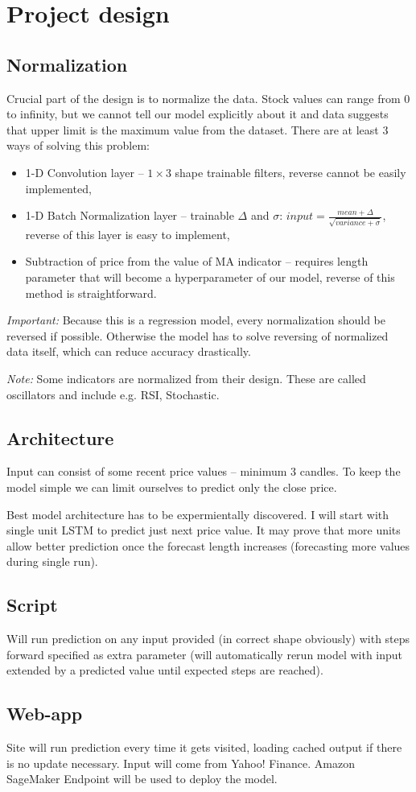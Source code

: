 \documentclass[a4paper,12pt]{article}
\begin{document}
\section{Project design}
\subsection{Normalization}
Crucial part of the design is to normalize the data.
Stock values can range from 0 to infinity, but we cannot tell our model explicitly about it and data suggests that upper limit is the maximum value from the dataset.
There are at least 3 ways of solving this problem:
\begin{itemize}
	\item 1-D Convolution layer -- $1\times3$ shape trainable filters, reverse cannot be easily implemented,
	\item 1-D Batch Normalization layer -- trainable $\Delta$ and $\sigma$: $input = \frac{mean + \Delta}{\sqrt{variance + \sigma}}$, reverse of this layer is easy to implement,
	\item Subtraction of price from the value of MA indicator -- requires length parameter that will become a hyperparameter of our model, reverse of this method is straightforward.
\end{itemize}

\textit{Important:} Because this is a regression model, every normalization should be reversed if possible. Otherwise the model has to solve reversing of normalized data itself, which can reduce accuracy drastically.

\textit{Note:} Some indicators are normalized from their design. These are called oscillators and include e.g. RSI, Stochastic.

\subsection{Architecture}
Input can consist of some recent price values -- minimum 3 candles. To keep the model simple we can limit ourselves to predict only the close price.

Best model architecture has to be expermientally discovered. I will start with single unit LSTM to predict just next price value. It may prove that more units allow better prediction once the forecast length increases (forecasting more values during single run).

\subsection{Script}
Will run prediction on any input provided (in correct shape obviously) with steps forward specified as extra parameter (will automatically rerun model with input extended by a predicted value until expected steps are reached).

\subsection{Web-app}
Site will run prediction every time it gets visited, loading cached output if there is no update necessary. Input will come from Yahoo! Finance. Amazon SageMaker Endpoint will be used to deploy the model.
\end{document}
